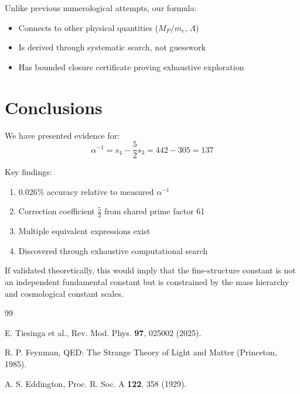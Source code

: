 \documentclass[twocolumn,prl,aps,superscriptaddress]{revtex4-2}
\begin{document}
Unlike previous numerological attempts, our formula:
\begin{itemize}
\item Connects to other physical quantities ($M_P/m_e$, $\Lambda$)
\item Is derived through systematic search, not guesswork
\item Has bounded closure certificate proving exhaustive exploration
\end{itemize}

\section{Conclusions}

We have presented evidence for:
\begin{equation}
\alpha^{-1} = s_4 - \frac{5}{2}s_3 = 442 - 305 = 137
\end{equation}

Key findings:
\begin{enumerate}
\item 0.026\% accuracy relative to measured $\alpha^{-1}$
\item Correction coefficient $\frac{5}{2}$ from shared prime factor 61
\item Multiple equivalent expressions exist
\item Discovered through exhaustive computational search
\end{enumerate}

If validated theoretically, this would imply that the fine-structure constant
is not an independent fundamental constant but is constrained by the mass 
hierarchy and cosmological constant scales.

\begin{thebibliography}{99}

E. Tiesinga et al., Rev. Mod. Phys. \textbf{97}, 025002 (2025).

R. P. Feynman, QED: The Strange Theory of Light and Matter (Princeton, 1985).

A. S. Eddington, Proc. R. Soc. A \textbf{122}, 358 (1929).

\end{thebibliography}
\end{document}
